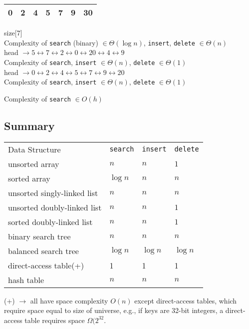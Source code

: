 \noindent \begin{tabular}{| l | l | l | l | l | l | l |}
	\hline 0 & 2 & 4 & 5 & 7 & 9 & 30 \\ \hline
\end{tabular} size[7] \\
Complexity of \texttt{search} (binary) $\in \Theta(\log n)$, \texttt{insert}, \texttt{delete} $\in \Theta(n)$ \\


\noindent head $\rightarrow 5 \leftrightarrow 7 \leftrightarrow 2 \leftrightarrow 0 \leftrightarrow 20 \leftrightarrow 4 \leftrightarrow 9$ \\
Complexity of \texttt{search}, \texttt{insert} $\in \Theta(n)$, \texttt{delete} $\in \Theta(1)$ \\

\noindent head $\rightarrow 0 \leftrightarrow 2 \leftrightarrow 4 \leftrightarrow 5 \leftrightarrow 7 \leftrightarrow 9 \leftrightarrow 20$ \\
Complexity of \texttt{search}, \texttt{insert} $\in \Theta(n)$, \texttt{delete} $\in \Theta(1)$ \\


\begin{center}
\end{center}
Complexity of \texttt{search} $\in O(h)$

\subsection*{Summary}

\begin{tabular}{l l l l}
	Data Structure & \texttt{search} & \texttt{insert} & \texttt{delete} \\
	unsorted array & $n$ & $n$ & $1$ \\
	sorted array & $\log n$ & $n$ & $n$ \\
	unsorted singly-linked list & $n$ & $n$ & $n$ \\
	unsorted doubly-linked list & $n$ & $n$ & $1$ \\
	sorted doubly-linked list & $n$ & $n$ & $1$ \\
	binary search tree & $n$ & $n$ & $n$ \\
	balanced search tree & $\log n$ & $\log n$ & $\log n$ \\
	direct-access table(+) & 1 & 1 & 1 \\
	hash table & $n$ & $n$ & $n$ \\
\end{tabular}

\noindent (+) $\rightarrow$ all have space complexity $O(n)$ except direct-access tables, which require space equal to size of universe, e.g., if keys are 32-bit integers, a direct-access table requires space $\Omega(2^{32}$.


